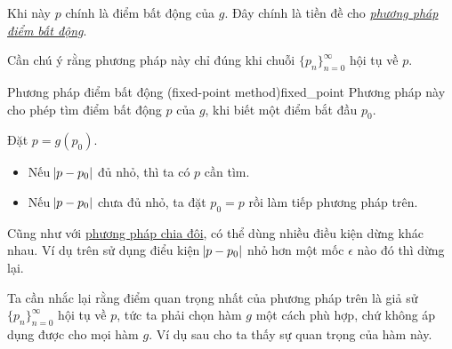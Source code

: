 \documentclass[../../Lectures]{subfiles}
\begin{document}
Khi này \(p\) chính là điểm bất động của \(g\). Đây chính là tiền đề cho
\hyperref[method:fixed_point]{\emph{phương pháp điểm bất động}}.

Cần chú ý rằng phương pháp này chỉ đúng khi chuỗi \(\{p_n\}_{n=0}^\infty\) hội
tụ về \(p\).

\begin{cmethod}{Phương pháp điểm bất động (fixed-point method)}{fixed_point}
    Phương pháp này cho phép tìm điểm bất động \(p\) của \(g\), khi biết một
    điểm bắt đầu \(p_0\).

    Đặt \(p = g(p_0)\).

    \begin{itemize}
        \item Nếu \(\abs{p - p_0}\) đủ nhỏ, thì ta có \(p\) cần tìm.
        \item Nếu \(\abs{p - p_0}\) chưa đủ nhỏ, ta đặt \(p_0 = p\) rồi làm tiếp
            phương pháp trên.
    \end{itemize}
\end{cmethod}

Cũng như với \hyperref[method:bisection]{phương pháp chia đôi}, có thể dùng
nhiều điều kiện dừng khác nhau. Ví dụ trên sử dụng điểu kiện \(\abs{p - p_0}\)
nhỏ hơn một mốc \(\epsilon\) nào đó thì dừng lại.

Ta cần nhắc lại rằng điểm quan trọng nhất của phương pháp trên là giả sử
\(\{p_n\}_{n=0}^\infty\) hội tụ về \(p\), tức ta phải chọn hàm \(g\) một cách
phù hợp, chứ không áp dụng được cho mọi hàm \(g\). Ví dụ sau cho ta thấy sự quan
trọng của hàm này.
\end{document}
